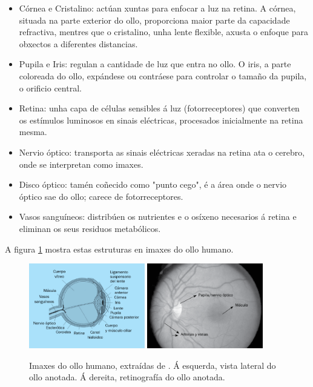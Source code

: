  \begin{itemize}
 \item Córnea e Cristalino: actúan xuntas para enfocar a luz na retina. A córnea, situada na parte exterior do ollo, proporciona maior parte da capacidade refractiva, mentres que o cristalino, unha lente flexible, axusta o enfoque para obxectos a diferentes distancias.
 \item Pupila e Iris: regulan a cantidade de luz que entra no ollo. O iris, a parte coloreada do ollo, expándese ou contráese para controlar o tamaño da pupila, o orificio central.
 \item Retina: unha capa de células sensibles á luz (fotorreceptores) que converten os estímulos luminosos en sinais eléctricas, procesados inicialmente na retina mesma.
 \item Nervio óptico: transporta as sinais eléctricas xeradas na retina ata o cerebro, onde se interpretan como imaxes.
 \item Disco óptico: tamén coñecido como "punto cego", é a área onde o nervio óptico sae do ollo; carece de fotorreceptores.
 \item Vasos sanguíneos: distribúen os nutrientes e o osíxeno necesarios á retina e eliminan os seus residuos metabólicos.
 \end{itemize}

A figura \ref{fig:imaxes_ojo} mostra estas estruturas en imaxes do ollo humano.

\begin{figure}[ht!]
    \centering
    \includegraphics[width=0.45\textwidth]{imaxes/ojo1.png}
    \includegraphics[width=0.45\textwidth]{imaxes/ojo2.png}
    \caption{Imaxes do ollo humano, extraídas de \cite{visionyojo}. Á esquerda, vista lateral do ollo anotada. Á dereita, retinografía do ollo anotada.}
    \label{fig:imaxes_ojo}
\end{figure}

